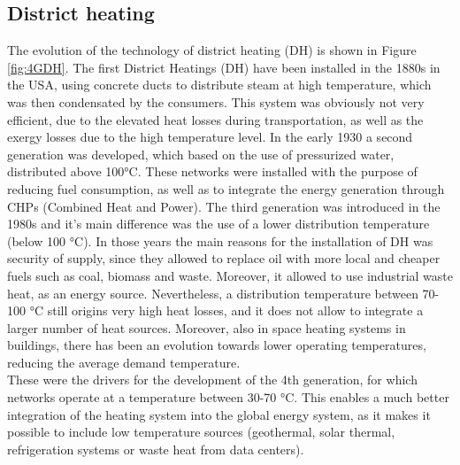 \documentclass{article}
\begin{document}
\subsection{District heating}
The evolution of the technology of district heating (DH) is shown in Figure \ref{fig:4GDH}.
The first District Heatings (DH) have been installed in the 1880s in the USA, using concrete ducts to distribute steam at high temperature, which was then condensated by the consumers. This system was obviously not very efficient, due to the elevated heat losses during transportation, as well as the exergy losses due to the high temperature level. In the early 1930 a second generation was developed, which based on the use of pressurized water, distributed above 100\si{\celsius}. These networks were installed with the purpose of reducing fuel consumption, as well as to integrate the energy generation through CHPs (Combined Heat and Power). The third generation was introduced in the 1980s and it's main difference was the use of a lower distribution temperature (below 100 \si{\celsius}). In those years the main reasons for the installation of DH was security of supply, since they allowed to replace oil with more local and cheaper fuels such as coal, biomass and waste. Moreover, it allowed to use industrial waste heat, as an energy source. Nevertheless, a distribution temperature between 70-100 \si{\celsius} still origins very high heat losses, and it does not allow to integrate a larger number of heat sources. Moreover, also in space heating systems in buildings, there has been an evolution towards lower operating temperatures, reducing the average demand temperature.\\
These were the drivers for the development of the 4th generation, for which networks operate at a temperature between 30-70 \si{\celsius}. This enables a much better integration of the heating system into the global energy system, as it makes it possible to include low temperature sources (geothermal, solar thermal, refrigeration systems or waste heat from data centers).
 
\end{document}
